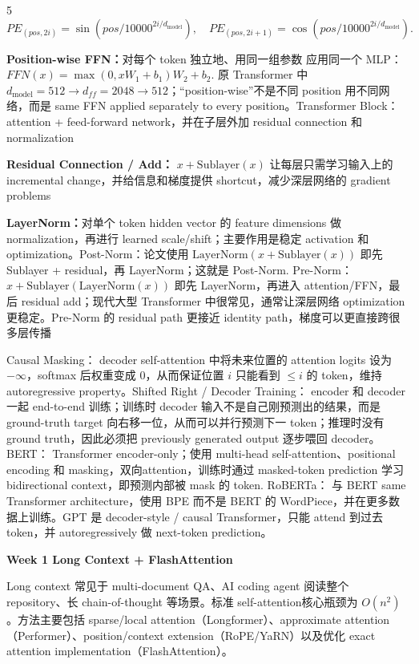 \documentclass[a4paper, landscape]{article}
\newcommand{\topic}[1]{\par\medskip\textbf{#1}\par}
\renewcommand{\topic}[1]{%
  \par\smallskip\noindent
  \colorbox{highlightcolor}{%
    \parbox{\dimexpr\columnwidth-2\fboxsep\relax}{%
      \textbf{#1}%
    }%
  }%
  \par
}
\begin{document}
\begin{multicols}{5}
\(
PE_{(pos,2i)}=\sin(pos/10000^{2i/d_{\text{model}}}),
\quad
PE_{(pos,2i+1)}=\cos(pos/10000^{2i/d_{\text{model}}}).
\)
\par \textbf{Position-wise FFN：}对每个 token 独立地、用同一组参数 应用同一个 MLP：
\(
FFN(x)=\max(0,xW_1+b_1)W_2+b_2.
\)
原 Transformer 中 \(d_{\text{model}}=512\rightarrow d_{ff}=2048\rightarrow512\)；“position-wise”不是不同 position 用不同网络，而是 same FFN applied separately to every position。Transformer Block： attention + feed-forward network，并在子层外加 residual connection 和 normalization
\par \textbf{Residual Connection / Add：}
\(
x+\mathrm{Sublayer}(x)
\)
让每层只需学习输入上的 incremental change，并给信息和梯度提供 shortcut，减少深层网络的 gradient problems
\par \textbf{LayerNorm：}对单个 token hidden vector 的 feature dimensions 做 normalization，再进行 learned scale/shift；主要作用是稳定 activation 和 optimization。Post-Norm：论文使用
\(
\mathrm{LayerNorm}(x+\mathrm{Sublayer}(x))
\)
即先Sublayer + residual，再 LayerNorm；这就是 Post-Norm.
Pre-Norm：
\(
x+\mathrm{Sublayer}(\mathrm{LayerNorm}(x))
\)
即先 LayerNorm，再进入 attention/FFN，最后 residual add；现代大型 Transformer 中很常见，通常让深层网络 optimization 更稳定。Pre-Norm 的 residual path 更接近 identity path，梯度可以更直接跨很多层传播
\par Causal Masking： decoder self-attention 中将未来位置的 attention logits 设为 \(-\infty\)，softmax 后权重变成 0，从而保证位置 \(i\) 只能看到 \(\le i\) 的 token，维持 autoregressive property。Shifted Right / Decoder Training： encoder 和 decoder 一起 end-to-end 训练；训练时 decoder 输入不是自己刚预测出的结果，而是 ground-truth target 向右移一位，从而可以并行预测下一 token；推理时没有 ground truth，因此必须把 previously generated output 逐步喂回 decoder。BERT： Transformer encoder-only；使用 multi-head self-attention、positional encoding 和 masking，双向attention，训练时通过 masked-token prediction 学习 bidirectional context，即预测内部被 mask 的 token. RoBERTa： 与 BERT same Transformer architecture，使用 BPE 而不是 BERT 的 WordPiece，并在更多数据上训练。GPT 是 decoder-style / causal Transformer，只能 attend 到过去 token，并 autoregressively 做 next-token prediction。

\topic{Week 1 Long Context + FlashAttention}
\par Long context 常见于 multi-document QA、AI coding agent 阅读整个 repository、长 chain-of-thought 等场景。标准 self-attention核心瓶颈为 \(O(n^2)\)。方法主要包括 sparse/local attention（Longformer）、approximate attention（Performer）、position/context extension（RoPE/YaRN）以及优化 exact attention implementation（FlashAttention）。


\end{multicols}
\end{document}
